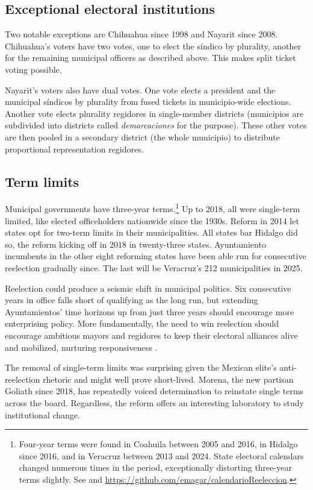 \documentclass[letter,12pt]{article}
\begin{document}
\subsection{Exceptional electoral institutions}
Two notable exceptions are Chihuahua since 1998 and Nayarit since 2008. Chihuahua's voters have two votes, one to elect the síndico by plurality, another for the remaining municipal officers as described above. This makes split ticket voting possible. 

Nayarit's voters also have dual votes. One vote elects a president and the municipal síndicos by plurality from fused tickets in municipio-wide elections. Another vote elects plurality regidores in single-member districts (municipios are subdivided into districts called \emph{demarcaciones} for the purpose). These other votes are then pooled in a secondary district (the whole municipio) to distribute proportional representation regidores.

\subsection{Term limits}
Municipal governments have three-year terms.\footnote{Four-year terms were found in Coahuila between 2005 and 2016, in Hidalgo since 2016, and in Veracruz between 2013 and 2024. State electoral calendars changed numerous times in the period, exceptionally distorting three-year terms slightly. See \citet{magarInstReel.2017} and \url{https://github.com/emagar/calendarioReeleccion}.} Up to 2018, all were single-term limited, like elected officeholders nationwide since the 1930s. Reform in 2014 let states opt for two-term limits in their municipalities. All states bar Hidalgo did so, the reform kicking off in 2018 in twenty-three states. Ayuntamiento incumbents in the other eight reforming states have been able run for consecutive reelection gradually since. The last will be Veracruz's 212 municipalities in 2025.

Reelection could produce a seismic shift in municipal politics. Six consecutive years in office falls short of qualifying as the long run, but extending Ayuntamientos' time horizons up from just three years should encourage more enterprising policy. More fundamentally, the need to win reelection should encourage ambitious mayors and regidores to keep their electoral alliances alive and mobilized, nurturing responsiveness \citep{cain.etal.1987, jacobson.kernell.1983, cox.mccubbins.1986}.

The removal of single-term limits was surprising given the Mexican elite's anti-reelection rhetoric and might well prove short-lived. Morena, the new partisan Goliath since 2018, has repeatedly voiced determination to reinstate single terms across the board. Regardless, the reform offers an interesting laboratory to study institutional change.   
\end{document}
